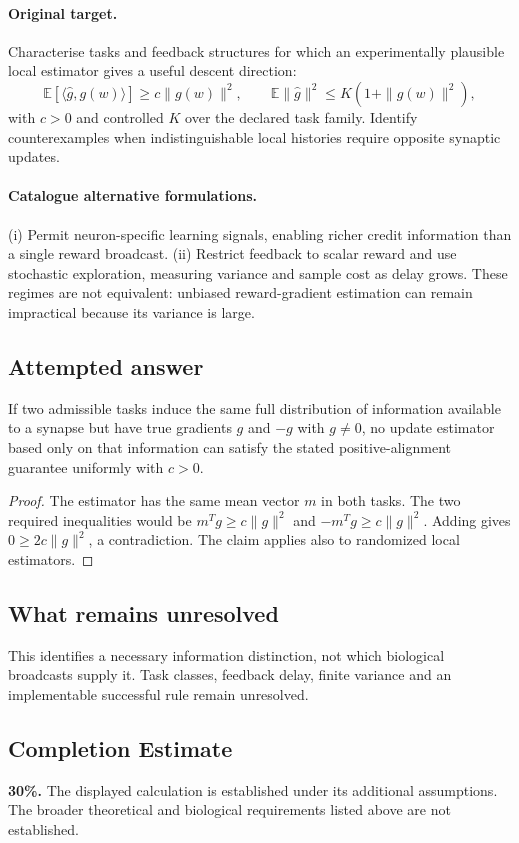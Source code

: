 \documentclass[11pt]{article}
\begin{document}
\paragraph{Original target.}
Characterise tasks and feedback structures for which an experimentally plausible local estimator gives a useful descent direction:
\[
\mathbb{E}[\langle\widehat g,g(w)\rangle]\geq c\|g(w)\|^2,
\qquad
\mathbb{E}\|\widehat g\|^2\leq K(1+\|g(w)\|^2),
\]
with $c>0$ and controlled $K$ over the declared task family. Identify counterexamples when indistinguishable local histories require opposite synaptic updates.
\paragraph{Catalogue alternative formulations.}
(i) Permit neuron-specific learning signals, enabling richer credit information than a single reward broadcast. (ii) Restrict feedback to scalar reward and use stochastic exploration, measuring variance and sample cost as delay grows. These regimes are not equivalent: unbiased reward-gradient estimation can remain impractical because its variance is large.
\subsection{Attempted answer}
\begin{proposition}
If two admissible tasks induce the same full distribution of information available to a synapse but have true gradients $g$ and $-g$ with $g\ne0$, no update estimator based only on that information can satisfy the stated positive-alignment guarantee uniformly with $c>0$.
\end{proposition}
\begin{proof}
The estimator has the same mean vector $m$ in both tasks. The two required inequalities would be $m^Tg\geq c\|g\|^2$ and $-m^Tg\geq c\|g\|^2$. Adding gives $0\geq2c\|g\|^2$, a contradiction. The claim applies also to randomized local estimators.
\end{proof}
\subsection{What remains unresolved}
This identifies a necessary information distinction, not which biological broadcasts supply it. Task classes, feedback delay, finite variance and an implementable successful rule remain unresolved.
\subsection{Completion Estimate}
\textbf{30\%.} The displayed calculation is established under its additional assumptions. The broader theoretical and biological requirements listed above are not established.
\end{document}
